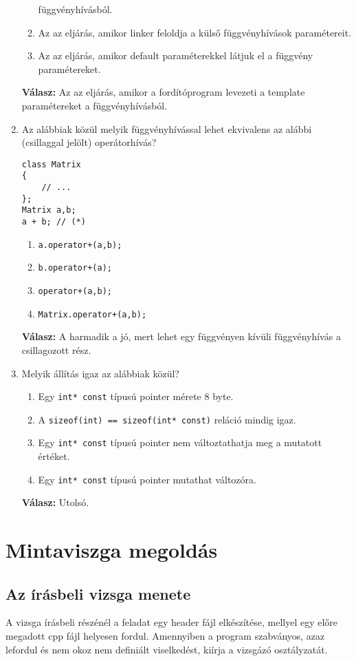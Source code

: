\documentclass[a4paper,11.5pt,table]{article}
\begin{document}
\begin{enumerate}[1.)]
\begin{enumerate}
			függvényhívásból.
			\item Az az eljárás, amikor linker feloldja a külső függvényhívások paramétereit.
			\item Az az eljárás, amikor default paraméterekkel látjuk el a függvény
			paramétereket.
		\end{enumerate}
		\textbf{Válasz:} Az az eljárás, amikor a fordítóprogram levezeti a template paramétereket a
		függvényhívásból.
		\item Az alábbiak közül melyik függvényhívással lehet ekvivalens az alábbi
		(csillaggal jelölt) operátorhívás?
		\begin{lstlisting}
class Matrix
{
	// ...
};
Matrix a,b;
a + b; // (*)
		\end{lstlisting}
		\begin{enumerate}
			\item \texttt{a.operator+(a,b);}
			\item \texttt{b.operator+(a);}
			\item \texttt{operator+(a,b);}
			\item \texttt{Matrix.operator+(a,b);}
		\end{enumerate}
		\textbf{Válasz:} A harmadik a jó, mert lehet egy függvényen kívüli függvényhívás a csillagozott rész.
		\item Melyik állítás igaz az alábbiak közül?
		\begin{enumerate}
			\item Egy \texttt{int* const} típusú pointer mérete 8 byte.
			\item A \texttt{sizeof(int) == sizeof(int* const)} reláció mindig igaz.
			\item Egy \texttt{int* const} típusú pointer nem változtathatja meg a mutatott értéket.
			\item Egy \texttt{int* const} típusú pointer mutathat változóra.
		\end{enumerate}
		\textbf{Válasz:} Utolsó.
	\end{enumerate}
	\section{Mintaviszga megoldás}
	\subsection{Az írásbeli vizsga menete}
	A vizsga írásbeli részénél a feladat egy header fájl elkészítése, mellyel egy előre megadott cpp fájl helyesen fordul. Amennyiben a program szabványos, azaz lefordul és nem okoz nem definiált viselkedést, kiírja a vizsgázó osztályzatát.
	
\end{document}
